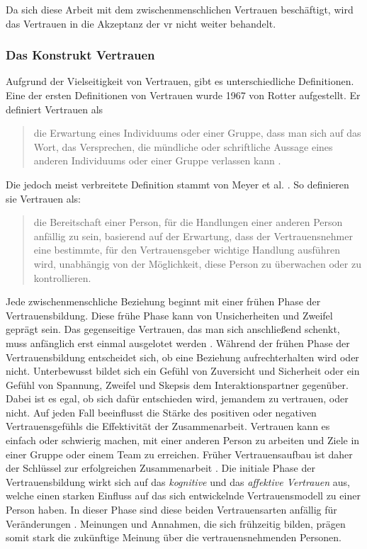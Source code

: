 \documentclass[a4paper,11pt]{article}%
\renewcommand{\\}{\vspace*{0.5\baselineskip} \newline}
\begin{document}
Da sich diese Arbeit mit dem zwischenmenschlichen Vertrauen beschäftigt, wird das Vertrauen in die Akzeptanz der \ac{vr} nicht weiter behandelt.
\subsubsection{Das Konstrukt Vertrauen}
\label{Konstrukt des Vertrauens}
Aufgrund der Vielseitigkeit von Vertrauen, gibt es unterschiedliche Definitionen. \newline
Eine der ersten Definitionen von Vertrauen wurde 1967 von Rotter aufgestellt. Er definiert Vertrauen als 
\begin{quote}
\glqq{}die Erwartung eines Individuums oder einer Gruppe, dass man sich auf das Wort, das Versprechen, die mündliche oder schriftliche Aussage eines anderen Individuums oder einer Gruppe verlassen kann\dq{} \citep[S. 651]{rotter1967new}.
\end{quote}
Die jedoch meist verbreitete Definition stammt von Meyer et al. \citep[S. 712]{mayer1995integrative}. So definieren sie Vertrauen als:
\begin{quote} \glqq{}die Bereitschaft einer Person, für die Handlungen einer anderen Person anfällig zu sein, basierend auf der Erwartung, dass der Vertrauensnehmer eine bestimmte, für den Vertrauensgeber wichtige Handlung ausführen wird, unabhängig von der Möglichkeit, diese Person zu überwachen oder zu kontrollieren.\dq{} \end{quote}
Jede zwischenmenschliche Beziehung beginnt mit einer frühen Phase der Vertrauensbildung. Diese frühe Phase kann von Unsicherheiten und Zweifel geprägt sein. Das gegenseitige Vertrauen, das man sich anschließend schenkt, muss anfänglich erst einmal ausgelotet werden \citep[S. 166-168]{meyerson1996swift}.
Während der frühen Phase der Vertrauensbildung entscheidet sich, ob eine Beziehung aufrechterhalten wird oder nicht. Unterbewusst bildet sich ein Gefühl von Zuversicht und Sicherheit oder ein Gefühl von Spannung, Zweifel und Skepsis dem Interaktionspartner gegenüber. 
Dabei ist es egal, ob sich dafür entschieden wird, jemandem zu vertrauen, oder nicht. Auf jeden Fall beeinflusst die Stärke des positiven oder negativen Vertrauensgefühls die Effektivität der Zusammenarbeit. Vertrauen kann es einfach oder schwierig machen, mit einer anderen Person zu arbeiten und Ziele in einer Gruppe oder einem Team zu erreichen.
Früher Vertrauensaufbau ist daher der Schlüssel zur erfolgreichen Zusammenarbeit \citep[S. 405-406]{bigley1998straining}.
Die initiale Phase der Vertrauensbildung wirkt sich auf das \textit{kognitive} und das \textit{affektive Vertrauen} aus, welche einen starken Einfluss auf das sich entwickelnde Vertrauensmodell zu einer Person haben. In dieser Phase sind diese beiden Vertrauensarten anfällig für Veränderungen \citep[S. 461-462]{baldwin1992relational}.
Meinungen und Annahmen, die sich frühzeitig bilden, prägen somit stark die zukünftige Meinung über die vertrauensnehmenden Personen.
\end{document}

